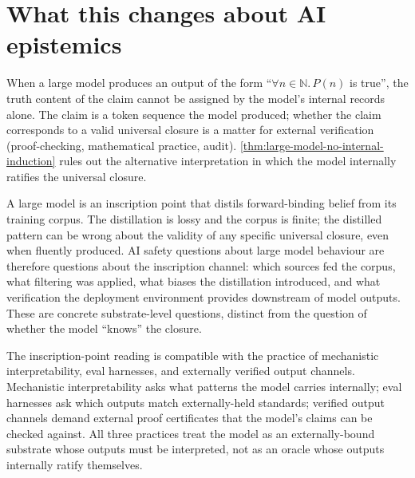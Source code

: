 \section{What this changes about AI epistemics}
\label{sec:large-model-ai-epistemics}

\begin{principle}
\label{prin:large-model-universal-claims-externally-interpreted}
When a large model produces an output of the form ``$\forall n \in \mathbb{N}.\, P(n)$ is true'', the truth content of the claim cannot be assigned by the model's internal records alone. The claim is a token sequence the model produced; whether the claim corresponds to a valid universal closure is a matter for external verification (proof-checking, mathematical practice, audit). \autoref{thm:large-model-no-internal-induction} rules out the alternative interpretation in which the model internally ratifies the universal closure.
\end{principle}

\begin{principle}
\label{prin:large-model-ai-safety-reading}
A large model is an inscription point that distils forward-binding belief from its training corpus. The distillation is lossy and the corpus is finite; the distilled pattern can be wrong about the validity of any specific universal closure, even when fluently produced. AI safety questions about large model behaviour are therefore questions about the inscription channel: which sources fed the corpus, what filtering was applied, what biases the distillation introduced, and what verification the deployment environment provides downstream of model outputs. These are concrete substrate-level questions, distinct from the question of whether the model ``knows'' the closure.
\end{principle}

\begin{remark}
\label{rem:large-model-compatibility-with-ai-safety}
The inscription-point reading is compatible with the practice of mechanistic interpretability, eval harnesses, and externally verified output channels. Mechanistic interpretability asks what patterns the model carries internally; eval harnesses ask which outputs match externally-held standards; verified output channels demand external proof certificates that the model's claims can be checked against. All three practices treat the model as an externally-bound substrate whose outputs must be interpreted, not as an oracle whose outputs internally ratify themselves.
\end{remark}

